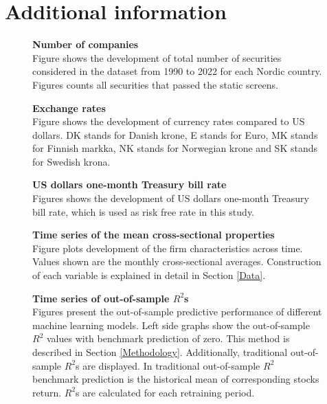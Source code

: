 \documentclass[12pt]{article}
\begin{document}
\clearpage

\section{Additional information}
\renewcommand{\thefigure}{C.\arabic{figure}}
\setcounter{figure}{0}
\renewcommand{\thetable}{C.\arabic{table}}
\setcounter{table}{0}

\begin{figure}[ht]
\centering
\caption[Number of companies]{\textbf{Number of companies}\\ Figure shows the development of total number of securities considered in the dataset from 1990 to 2022 for each Nordic country. Figures counts all securities that passed the static screens.}

\label{plot:number_of_companies}
\end{figure}

\begin{figure}[ht]
\centering
\caption[Exchange rates]{\textbf{Exchange rates}\\ Figure shows the development of currency rates compared to US dollars. DK stands for  Danish krone, E stands for Euro, MK stands for Finnish markka, NK stands for Norwegian krone and SK stands for Swedish krona.}

\label{plot:fx_rates}
\end{figure}

\begin{figure}[ht]
\centering
\caption[US dollar one-month Treasury bill rate]{\textbf{US dollars one-month Treasury bill rate}\\ Figures shows the development of US dollars one-month Treasury bill rate, which is used as risk free rate in this study.}

\label{plot:rf_ts}
\end{figure}

\begin{figure}[ht]
\centering
\caption[Time series of the mean cross-sectional properties]{\textbf{Time series of the mean cross-sectional properties}\\ Figure plots development of the firm characteristics across time. Values shown are the monthly cross-sectional averages. Construction of each variable is explained in detail in Section \ref{Data}.}

\label{plot:variableTS}
\end{figure}

\begin{figure}[ht]
\centering
\caption[Time series of out-of-sample $R^2$]{\textbf{Time series of out-of-sample \boldmath$R^2$s}\\ Figures present the out-of-sample predictive performance of different machine learning models. Left side graphs show the out-of-sample $R^2$ values with benchmark prediction of zero. This method is described in Section \ref{Methodology}. Additionally, traditional out-of-sample $R^2$s are displayed. In traditional out-of-sample $R^2$ benchmark prediction is the historical mean of corresponding stocks return. $R^2$s are calculated for each retraining period.}

\label{plot:OOSR2_ts}
\end{figure}
\end{document}
